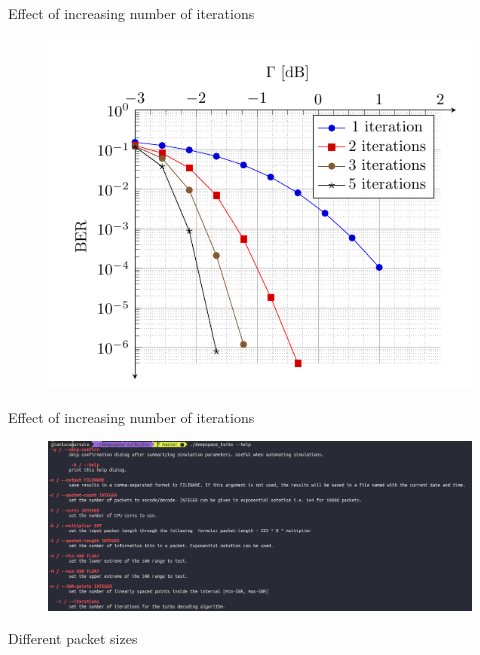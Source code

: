\documentclass[handout,xcolor={usenames,dvipsnames},11pt]{beamer}
\begin{document}
\begin{frame}[c]{Effect of increasing number of iterations}
    \begin{figure}
        \centering
       \includegraphics[height=0.9\textheight]{./images/BER}
    \end{figure}
\end{frame}
\begin{frame}[c]{Effect of increasing number of iterations}
    \begin{figure}
        \centering
       \includegraphics[width=1\textwidth]{./images/terminal}
    \end{figure}
\end{frame}
\begin{frame}[c]{Different packet sizes}
    
\end{frame}
\end{document}
